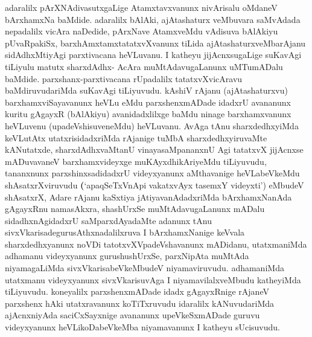 \begin{artha}
adaralilx pArXNAdivasutxgaLige Atamxtavxvanunx nivArisalu oMdaneV bArxhamxNa baMdide. adaralilx bAlAki, ajAtashaturx veMbuvara saMvAdada nepadalilx vicAra naDedide, pArxNave AtamxveMdu vAdisuva bAlAkiyu pUvaRpakiSx, barxhAmxtamxtatatxvXvanunx tiLida ajAtashaturxveMbarAjanu sidAdhxMtiyAgi parxtivacana heVLuvanu. I katheyu jijAcnxsugaLige suKavAgi tiLiyulu matutx sharxdAdhx- AcAra muMtAdavugaLanunx uMTumADalu baMdide. parxshanx-parxtivacana rUpadalilx tatatxvXvicAravu baMdiruvudariMda suKavAgi tiLiyuvudu. kAshiV rAjanu (ajAtashaturxvu) barxhamxviSayavanunx heVLu eMdu parxshenxmADade idadxrU avananunx kuritu gAgayxR (bAlAkiyu) avanidadxlilxge baMdu ninage barxhamxvanunx heVLuvenu (upadeVshisuveneMdu) heVLuvanu. AvAga tAnu sharxdedhxyiMda keVLutAtx utatxrisidadxriMda rAjanige tuMbA sharxdedhxyiruvaMte kANutatxde, sharxdAdhxvaMtanU vinayasaMpananxnU Agi tatatxvX jijAcnxse mADuvavaneV barxhamxvideyxge muKAyxdhikAriyeMdu tiLiyuvudu, tananxnunx parxshinxsadidadxrU videyxyanunx aMthavanige heVLabeVkeMdu shAsatxrXviruvudu \textbf(`apaqSeTxVnApi vakatxvAyx tasemxY videyxti') eMbudeV shAsatxrX, Adare rAjanu kaSxtiya jAtiyavanAdadxriMda bArxhamxNanAda gAgayxRnu namasAkxra, shashUrxSe muMtAdavugaLanunx mADalu sidadhxnAgidadxrU saMparxdAyadaMte adanunx tAnu sivxVkarisade\break gurusAthxnadalilxruva I bArxhamxNanige keVvala sharxdedhxyanunx noVDi tatotxvXVpadeVshavanunx mADidanu, utatxmaniMda \-adhamanu videyxyanunx gurushushUrxSe, parxNipAta muMtAda niyamagaLiMda sivxVkarisabeVkeMbudeV niyamaviruvudu. adhamaniMda utatxmanu videyxyanunx sivxVkarisuvAga I niyamavilalxveMbudu katheyiMda tiLiyuvudu. koneyalilx parxshenxmADade idadx gAgayxRnige rAjaneV parxshenx hAki utatxravanunx koTiTxruvudu idaralilx kANuvudariMda ajAcnxniyAda saciCxSayxnige avananunx upeVkeSxmADade guruvu videyxyanunx heVLikoDabeVkeMba niyamavanunx I katheyu sUcisuvudu.
\end{artha}

\centerline{}

